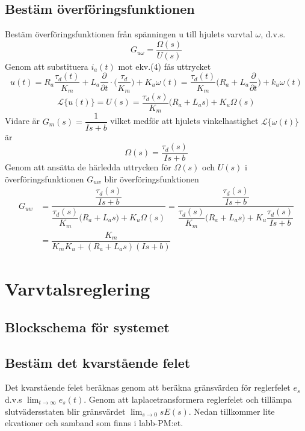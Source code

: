 \documentclass[11pt]{article}
\begin{document}
\subsection{Bestäm överföringsfunktionen}
Bestäm överföringsfunktionen från spänningen u till hjulets varvtal $\omega$, d.v.s.
$$
G_{u\omega}=\dfrac{\Omega(s)}{U(s)}
$$
Genom att substituera $i_a(t)$ mot ekv.(4) fås uttrycket
\begin{equation*}
u(t)=R_a\dfrac{\tau_d(t)}{K_m}+L_a\dfrac{\partial}{\partial t}\cdot\Big( \dfrac{\tau_d}{K_m}\Big)+K_u\omega(t) = \dfrac{\tau_d(t)}{K_m}\Big(R_a+L_a\dfrac{\partial}{\partial t}\Big)+k_u\omega(t)
\end{equation*}
\begin{equation*}
\mathcal{L}\{u(t)\} =U(s)= \dfrac{\tau_d(s)}{K_m}\Big(R_a+L_as\Big)+K_u\Omega(s)
\end{equation*}\newpage
Vidare är $G_m(s)=\dfrac{1}{Is+b}$ vilket medför att hjulets vinkelhastighet $\mathcal{L}\{\omega(t)\}$ är
\begin{equation*}
\Omega(s)=\dfrac{\tau_d(s)}{Is+b}
\end{equation*}
Genom att ansätta de härledda uttrycken för $\Omega(s)$ och $U(s)$ i överföringsfunktionen $G_{uw}$ blir överföringsfunktionen
\begin{equation*}
\begin{split}
G_{uw} &= \dfrac{\dfrac{\tau_d(s)}{Is+b}}{\dfrac{\tau_d(s)}{K_m}\Big(R_a+L_as\Big)+K_u\Omega(s)} = \dfrac{\dfrac{\tau_d(s)}{Is+b}}{\dfrac{\tau_d(s)}{K_m}\Big(R_a+L_as\Big)+K_u\dfrac{\tau_d(s)}{Is+b}}\\
&=\dfrac{K_m}{K_mK_u+(R_a+L_as)(Is+b)}
\end{split}
\end{equation*}
\section{Varvtalsreglering}
\subsection{Blockschema för systemet}
\subsection{Bestäm det kvarstående felet}
Det kvarstående felet beräknas genom att beräkna gränsvärden för reglerfelet $e_s$ d.v.s $\lim_{t \to \infty} e_s(t)$. Genom att laplacetransformera reglerfelet och tillämpa slutvädersstaten blir gränsvärdet $\lim_{s \to 0}sE(s)$. Nedan tillkommer lite ekvationer och samband som finns i labb-PM:et. 
\end{document}
